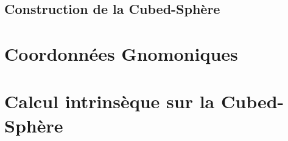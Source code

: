 \subsection{Construction de la Cubed-Sphère}













\section{Coordonnées Gnomoniques}


















\section{Calcul intrinsèque sur la Cubed-Sphère}


















